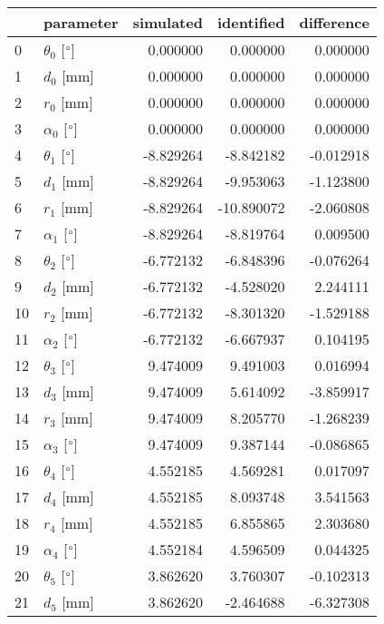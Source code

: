 \documentclass{standalone}%
\begin{document}
%
\normalsize%
\begin{tabular}{llrrr}
\toprule
{} &                 parameter & simulated & identified & difference \\
\midrule
0  &  $\theta_{0}$ [$\degree$] &  0.000000 &   0.000000 &   0.000000 \\
1  &              $d_{0}$ [mm] &  0.000000 &   0.000000 &   0.000000 \\
2  &              $r_{0}$ [mm] &  0.000000 &   0.000000 &   0.000000 \\
3  &  $\alpha_{0}$ [$\degree$] &  0.000000 &   0.000000 &   0.000000 \\
4  &  $\theta_{1}$ [$\degree$] & -8.829264 &  -8.842182 &  -0.012918 \\
5  &              $d_{1}$ [mm] & -8.829264 &  -9.953063 &  -1.123800 \\
6  &              $r_{1}$ [mm] & -8.829264 & -10.890072 &  -2.060808 \\
7  &  $\alpha_{1}$ [$\degree$] & -8.829264 &  -8.819764 &   0.009500 \\
8  &  $\theta_{2}$ [$\degree$] & -6.772132 &  -6.848396 &  -0.076264 \\
9  &              $d_{2}$ [mm] & -6.772132 &  -4.528020 &   2.244111 \\
10 &              $r_{2}$ [mm] & -6.772132 &  -8.301320 &  -1.529188 \\
11 &  $\alpha_{2}$ [$\degree$] & -6.772132 &  -6.667937 &   0.104195 \\
12 &  $\theta_{3}$ [$\degree$] &  9.474009 &   9.491003 &   0.016994 \\
13 &              $d_{3}$ [mm] &  9.474009 &   5.614092 &  -3.859917 \\
14 &              $r_{3}$ [mm] &  9.474009 &   8.205770 &  -1.268239 \\
15 &  $\alpha_{3}$ [$\degree$] &  9.474009 &   9.387144 &  -0.086865 \\
16 &  $\theta_{4}$ [$\degree$] &  4.552185 &   4.569281 &   0.017097 \\
17 &              $d_{4}$ [mm] &  4.552185 &   8.093748 &   3.541563 \\
18 &              $r_{4}$ [mm] &  4.552185 &   6.855865 &   2.303680 \\
19 &  $\alpha_{4}$ [$\degree$] &  4.552184 &   4.596509 &   0.044325 \\
20 &  $\theta_{5}$ [$\degree$] &  3.862620 &   3.760307 &  -0.102313 \\
21 &              $d_{5}$ [mm] &  3.862620 &  -2.464688 &  -6.327308 \\

\end{tabular}
\end{document}
